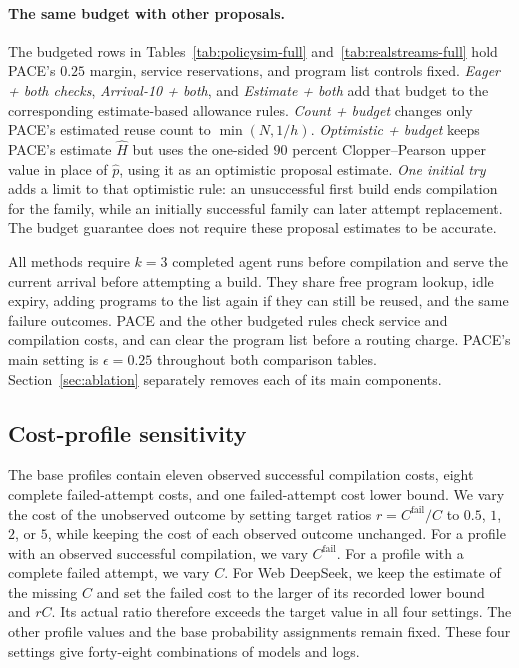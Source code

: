 \paragraph{The same budget with other proposals.}
The budgeted rows in Tables~\ref{tab:policysim-full} and~\ref{tab:realstreams-full} hold PACE's $0.25$ margin, service reservations, and program list controls fixed.
\emph{Eager + both checks}, \emph{Arrival-10 + both}, and \emph{Estimate + both} add that budget to the corresponding estimate-based allowance rules.
\emph{Count + budget} changes only PACE's estimated reuse count to $\min(N,1/h)$.
\emph{Optimistic + budget} keeps PACE's estimate $\hat H$ but uses the one-sided $90$ percent Clopper--Pearson upper value in place of $\hat p$, using it as an optimistic proposal estimate.
\emph{One initial try} adds a limit to that optimistic rule: an unsuccessful first build ends compilation for the family, while an initially successful family can later attempt replacement.
The budget guarantee does not require these proposal estimates to be accurate.

All methods require $k=3$ completed agent runs before compilation and serve the current arrival before attempting a build.
They share free program lookup, idle expiry, adding programs to the list again if they can still be reused, and the same failure outcomes.
PACE and the other budgeted rules check service and compilation costs, and can clear the program list before a routing charge.
PACE's main setting is $\epsilon=0.25$ throughout both comparison tables.
Section~\ref{sec:ablation} separately removes each of its main components.


\subsection{Cost-profile sensitivity}\label{app:cost-sensitivity}

The base profiles contain eleven observed successful compilation costs, eight complete failed-attempt costs, and one failed-attempt cost lower bound.
We vary the cost of the unobserved outcome by setting target ratios $r=C^{\mathrm{fail}}/C$ to $0.5$, $1$, $2$, or $5$, while keeping the cost of each observed outcome unchanged.
For a profile with an observed successful compilation, we vary $C^{\mathrm{fail}}$.
For a profile with a complete failed attempt, we vary $C$.
For Web DeepSeek, we keep the estimate of the missing $C$ and set the failed cost to the larger of its recorded lower bound and $rC$.
Its actual ratio therefore exceeds the target value in all four settings.
The other profile values and the base probability assignments remain fixed.
These four settings give forty-eight combinations of models and logs.

